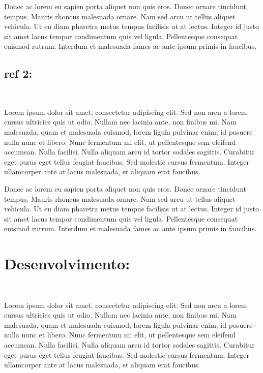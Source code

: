 \documentclass[11pt, a4paper]{article} %
\begin{document}
Donec ac lorem eu sapien porta aliquet non quis eros. Donec ornare tincidunt tempus. Mauris rhoncus malesuada ornare. Nam sed arcu ut tellus aliquet vehicula. Ut eu diam pharetra metus tempus facilisis ut at lectus. Integer id justo sit amet lacus tempor condimentum quis vel ligula. Pellentesque consequat euismod rutrum. Interdum et malesuada fames ac ante ipsum primis in faucibus. \par

\subsection{ref 2:} %
\par
\textcolor{white}{.}\par
 \par Lorem ipsum dolor sit amet, consectetur adipiscing elit. Sed non arcu a lorem cursus ultricies quis ut odio. Nullam nec lacinia ante, non finibus mi. Nam malesuada, quam et malesuada euismod, lorem ligula pulvinar enim, id posuere nulla nunc et libero. Nunc fermentum mi elit, ut pellentesque sem eleifend accumsan. Nulla facilisi. Nulla aliquam arcu id tortor sodales sagittis. Curabitur eget purus eget tellus feugiat faucibus. Sed molestie cursus fermentum. Integer ullamcorper ante at lacus malesuada, et aliquam erat faucibus.

Donec ac lorem eu sapien porta aliquet non quis eros. Donec ornare tincidunt tempus. Mauris rhoncus malesuada ornare. Nam sed arcu ut tellus aliquet vehicula. Ut eu diam pharetra metus tempus facilisis ut at lectus. Integer id justo sit amet lacus tempor condimentum quis vel ligula. Pellentesque consequat euismod rutrum. Interdum et malesuada fames ac ante ipsum primis in faucibus. \par


\newpage

\section{Desenvolvimento:}
\textcolor{white}{.}\par
Lorem ipsum dolor sit amet, consectetur adipiscing elit. Sed non arcu a lorem cursus ultricies quis ut odio. Nullam nec lacinia ante, non finibus mi. Nam malesuada, quam et malesuada euismod, lorem ligula pulvinar enim, id posuere nulla nunc et libero. Nunc fermentum mi elit, ut pellentesque sem eleifend accumsan. Nulla facilisi. Nulla aliquam arcu id tortor sodales sagittis. Curabitur eget purus eget tellus feugiat faucibus. Sed molestie cursus fermentum. Integer ullamcorper ante at lacus malesuada, et aliquam erat faucibus.
\end{document}
